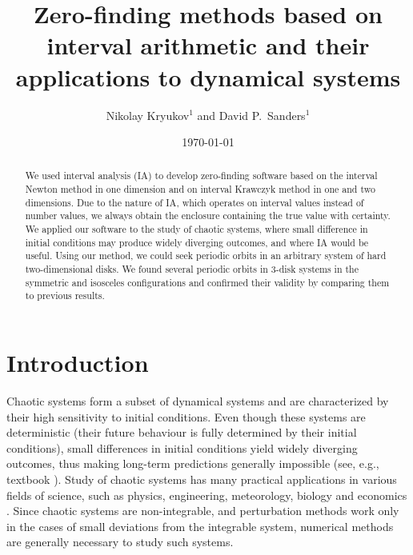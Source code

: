 \documentclass[pre, amsmath, amssymb, onecolumn, showpacs]{revtex4-1}
\begin{document}
\title{Zero-finding methods based on interval arithmetic and their applications to dynamical systems}

\author{Nikolay Kryukov$^{1}$ and David P.~Sanders$^{1}$}

\address{$^{1}$Departamento de F\'isica, Facultad de Ciencias, Universidad Nacional
Aut\'onoma de M\'exico,
Ciudad Universitaria, M\'exico D.F.\ 04510, Mexico
}

 \date{\today}


\begin{abstract}

We used interval analysis (IA) to develop zero-finding software based on the interval Newton method in one dimension and on interval Krawczyk method in one and two dimensions. Due to the nature of IA, which operates on interval values instead of number values, we always obtain the enclosure containing the true value with certainty. We applied our software to the study of chaotic systems, where small difference in initial conditions may produce widely diverging outcomes, and where IA would be useful. Using our method, we could seek periodic orbits in an arbitrary system of hard two-dimensional disks. We found several periodic orbits in 3-disk systems in the symmetric and isosceles configurations and confirmed their validity by comparing them to previous results.

\end{abstract}

\maketitle


%

\section{Introduction}

Chaotic systems form a subset of dynamical systems and are characterized by their high sensitivity to initial conditions. Even though these systems are deterministic (their future behaviour is fully determined by their initial conditions), small differences in initial conditions yield widely diverging outcomes, thus making long-term predictions generally impossible (see, e.g., textbook \cite{goldstein}). Study of chaotic systems has many practical applications in various fields of science, such as physics, engineering, meteorology, biology and economics \cite{tsonis, shukla, weixing1993quasiperiodic, giuggioli2013encounter, fradkov2005control, kopel1997improving}. Since chaotic systems are non-integrable, and perturbation methods work only in the cases of small deviations from the integrable system, numerical methods are generally necessary to study such systems.
\end{document}
